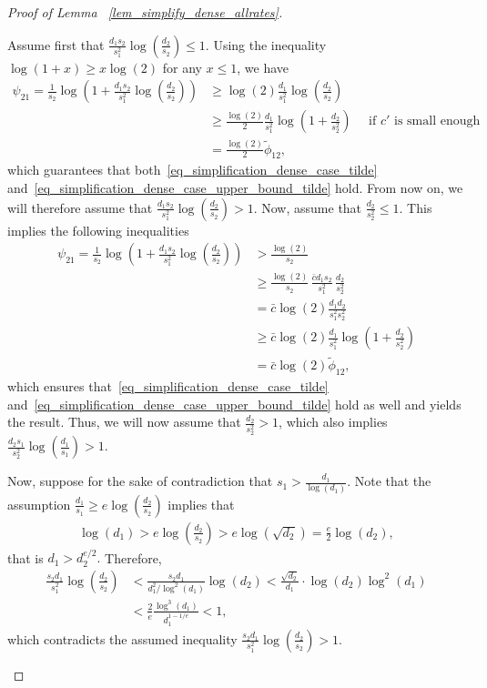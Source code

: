 \documentclass{article}
\theoremstyle{remark}
\begin{document}
\begin{proof}[Proof of Lemma ~\ref{lem_simplify_dense_allrates}]
\begin{enumerate}
    Assume first that $\frac{d_1s_2}{s_1^2} \log\left(\frac{d_2}{s_2}\right) \leq 1$. 
    Using the inequality $\log(1+x) \geq x\log(2) $ for any $x \leq 1$, we have 
    \begin{align*}
        \psi_{21} = \frac{1}{s_2} \log\left(1+\frac{d_1s_2}{s_1^2} \log\left(\frac{d_2}{s_2}\right)\right) &\geq \log(2) \frac{d_1}{s_1^2} \log\left(\frac{d_2}{s_2}\right)\\
        & \geq \frac{\log(2)}{2} \frac{d_1}{s_1^2} \log\left(1+\frac{d_2}{s_2^2}\right) \quad \text{ if $c'$ is small enough}\\
        & = \frac{\log(2)}{2} \widetilde \phi_{12},
    \end{align*}
    which guarantees that both~\eqref{eq_simplification_dense_case_tilde} and~\eqref{eq_simplification_dense_case_upper_bound_tilde} hold. 
    From now on, we will therefore assume that $\frac{d_1s_2}{s_1^2} \log\left(\frac{d_2}{s_2}\right) > 1$. 
    Now, assume that $\frac{d_2}{s_2^2} \leq 1$. 
    This implies the following inequalities   
    \begin{align*}
        \psi_{21} = \frac{1}{s_2} \log\left(1+\frac{d_1s_2}{s_1^2} \log\left(\frac{d_2}{s_2}\right)\right) &>\frac{\log(2)}{s_2} \\
        & \geq \frac{\log(2)}{s_2} \, \frac{\bar c d_1s_2}{s_1^2} \, \frac{d_2}{s_2^2} \\
        & = \bar c \log(2) \frac{d_1d_2}{s_1^2 s_2^2} \\
        & \geq \bar c \log(2) \frac{d_1}{s_1^2} \log\left(1+\frac{d_2}{s_2^2}\right)\\
        & = \bar c \log(2) \widetilde \phi_{12},
    \end{align*}
    which ensures that~\eqref{eq_simplification_dense_case_tilde} and~\eqref{eq_simplification_dense_case_upper_bound_tilde} hold as well and yields the result. 
    Thus, we will now assume that $\frac{d_2}{s_2^2}>1$, which also implies $\frac{d_2s_1}{s_2^2} \log\left(\frac{d_1}{s_1}\right)>1$.


    Now, suppose for the sake of contradiction that $s_1 > \frac{d_1}{\log(d_1)}$. 
    Note that the assumption $\frac{d_1}{s_1} \geq e \log\left(\frac{d_2}{s_2}\right)$ implies that
    \begin{align*}
        \log(d_1) > e\log\left(\frac{d_2}{s_2}\right) > e\log(\sqrt{d_2}) = \frac{e}{2} \log(d_2),
    \end{align*}
    that is $d_1 > d_2^{e/2}.$ Therefore, 
    \begin{align*}
        \frac{s_2 d_1}{s_1^2} \log\left(\frac{d_2}{s_2}\right) &< \frac{s_2d_1}{d_1^2/\log^2(d_1)}\log\left(d_2\right) < \frac{\sqrt{d_2}}{d_1 }\cdot \log(d_2)\log^2(d_1)\\
        & < \frac{2}{e}\frac{\log^3(d_1)}{d_1^{1-1/e}} <1,
    \end{align*}
    which contradicts the assumed inequality $ \frac{s_2 d_1}{s_1^2} \log\left(\frac{d_2}{s_2}\right)>1$. 


\end{enumerate}
\end{proof}
\end{document}
